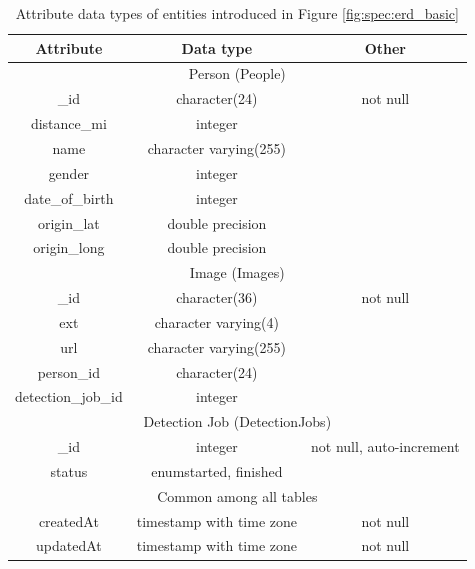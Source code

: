 \begin{table}[t]
    \begin{center}
        \begin{tabular}{| c | c | c |}
            \hline
            Attribute       & Data type              & Other \\ \hline
            \multicolumn{3}{|c|}{Person (People)} \\ \hline
            \_id           & character(24)            & not null   \\ \hline
            distance\_mi   & integer                  &            \\ \hline
            name          & character varying(255)   &            \\ \hline
            gender        & integer                  &            \\ \hline
            date\_of\_birth & integer                  &            \\ \hline
            origin\_lat    & double precision         &            \\ \hline
            origin\_long   & double precision         &            \\ \hline

            \multicolumn{3}{|c|}{Image (Images)} \\ \hline
            \_id              & character(36)            & not null   \\ \hline
            ext              & character varying(4)     &            \\ \hline
            url              & character varying(255)   &            \\ \hline
            person\_id        & character(24)            &            \\ \hline
            detection\_job\_id & integer                  &            \\ \hline

            \multicolumn{3}{|c|}{Detection Job (DetectionJobs)} \\ \hline
            \_id      & integer                     & not null, auto-increment \\ \hline
            status    & enum{started, finished}      &         \\ \hline

            \multicolumn{3}{|c|}{Common among all tables} \\ \hline
            createdAt & timestamp with time zone     & not null  \\ \hline
            updatedAt & timestamp with time zone     & not null  \\ \hline
        \end{tabular}
    \end{center}
    \caption{Attribute data types of entities introduced in Figure 
    \ref{fig:spec:erd_basic}}
    \label{table:spec:erd_basic_dt}
\end{table}


